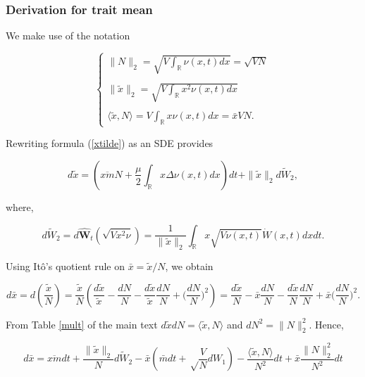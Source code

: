 \documentclass[]{article}
\begin{document}
\hypertarget{derivation-for-trait-mean}{%
\subsubsection{Derivation for trait
mean}\label{derivation-for-trait-mean}}

We make use of the notation

\begin{equation}
\left\{\begin{matrix}
\|N\|_2 = \sqrt{V\int_\mathbb{R}\nu(x,t)dx}= \sqrt{VN} \\ \\
\|\tilde x\|_2 = \sqrt{V\int_\mathbb{R}x^2\nu(x,t)dx} \\ \\
\langle\tilde x,N\rangle = V\int_\mathbb{R}x\nu(x,t)dx=\bar x VN.
\end{matrix}\right.
\end{equation}

Rewriting formula (\ref{xtilde}) as an SDE provides

\begin{equation}
d\tilde x=\left(\overline{xm}N+\frac{\mu}{2}\int_\mathbb{R}x\Delta\nu(x,t)dx\right)dt+\|\tilde x\|_2d\tilde W_2,
\end{equation}

where,

\begin{equation}
d\tilde{ W}_2=d\hat{\mathbf W}_t(\sqrt{V x^2\nu})=\frac{1}{\|\tilde x\|_2}\int_\mathbb{R}x\sqrt{V\nu(x,t)}\dot W(x,t)dxdt.
\end{equation}

Using Itô's quotient rule on \(\bar x=\tilde x/N\), we obtain

\begin{equation}
d\bar x = d\left(\frac{\tilde x}{N}\right)=\frac{\tilde x}{N}\left(\frac{d\tilde x}{\tilde x}-\frac{dN}{N}-\frac{d\tilde x}{\tilde x}\frac{dN}{N}+\Big(\frac{dN}{N}\Big)^2\right)
= \frac{d\tilde x}{N}-\bar x\frac{dN}{N}-\frac{d\tilde x}{N}\frac{dN}{N}+\bar x\Big(\frac{dN}{N}\Big)^2.
\end{equation}

From Table \ref{mult} of the main text
\(d\tilde xdN=\langle\tilde x,N\rangle\) and \(dN^2=\|N\|_2^2\). Hence,

\begin{equation}
d\bar x= \overline{xm}dt+\frac{\|\tilde x\|_2}{N}d\tilde W_2-\bar x\left(\bar m dt+\sqrt\frac{V}{N}dW_1\right)-\frac{\langle\tilde x,N\rangle}{N^2}dt+\bar x\frac{\|N\|_2^2}{N^2}dt
\end{equation}
\end{document}
